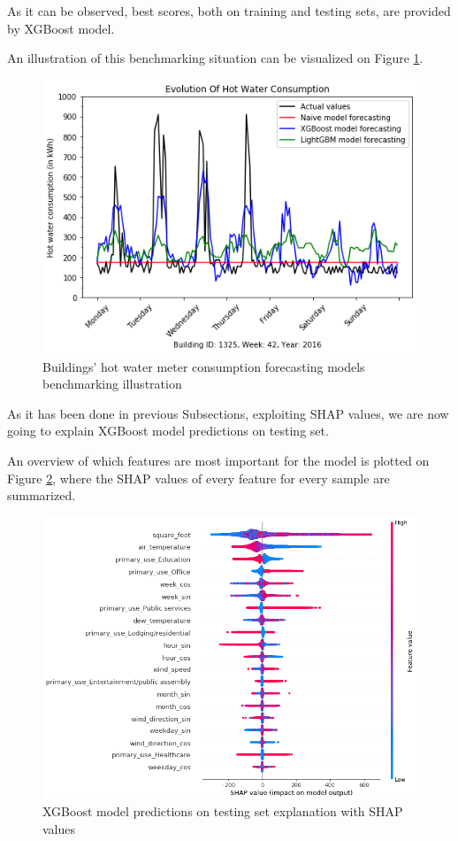 \documentclass[twocolumn, switch]{article}
\begin{document}
As it can be observed, best scores, both on training and testing sets, are provided by XGBoost model.

An illustration of this benchmarking situation can be visualized on Figure \ref{fig:hot_water_benchmarking_illustration}.

\begin{figure}[H]
\centering
\includegraphics[scale=0.35]{../graphs/sample_hot_water_consumption_comparison}
\caption{Buildings' hot water meter consumption forecasting models benchmarking illustration}
\label{fig:hot_water_benchmarking_illustration}
\end{figure}

As it has been done in previous Subsections, exploiting SHAP values, we are now going to explain XGBoost model predictions on testing set.

An overview of which features are most important for the model is plotted on Figure \ref{fig:shap_values_summary_plot_hot_water}, where the SHAP values of every feature for every sample are summarized.

\begin{figure}[H]
\centering
\includegraphics[scale=0.3]{../graphs/shap_values_summary_plot_hot_water}
\caption{XGBoost model predictions on testing set explanation with SHAP values}
\label{fig:shap_values_summary_plot_hot_water}
\end{figure}
\end{document}
